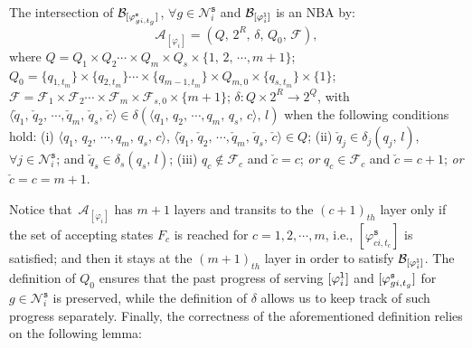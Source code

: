 \begin{definition}\label{ch03:def:intersect-all}
The intersection of $\mathcal{B}_{[\varphi_{gi,t_g}^{\textup{\texttt{s}}}]}$, $\forall g\in \mathcal{N}_i^\texttt{s}$ and $\mathcal{B}_{[\varphi_i^{\textup{\texttt{l}}}]}$ is an NBA by:
\begin{equation}\label{ch03:eq:intersect-all}
{\mathcal{A}}_{[\varphi_i]}=(Q,\, 2^{R},\, \delta, \, Q_0,\, \mathcal{F}),
\end{equation}
where $Q=Q_{1} \times Q_{2} \cdots \times Q_{m}\times Q_s  \times \{1,\,2,\,\cdots, m+1\}$; $Q_{0}=\{q_{1,t_m}\} \times \{q_{2,t_m}\} \cdots \times \{q_{m-1,t_m}\}\times  Q_{m,0}\times \{q_{s,t_m}\} \times \{1\}$; $\mathcal{F}=\mathcal{F}_{1}\times \mathcal{F}_{2} \cdots \times \mathcal{F}_{m}\times \mathcal{F}_{s,0}\times \{m+1\}$;   $\delta: Q \times 2^{R} \rightarrow 2^Q$, with $\langle \check{q}_1,\, \check{q}_2,\,\cdots,\check{q}_{m},\,\check{q}_s, \,\check{c}\rangle \in \delta(\langle {q}_1,\, {q}_2,\,\cdots,{q}_{m},\,{q}_s, \,{c}\rangle, \,l)$ when the following conditions hold:
(i) $\langle {q}_1,\, {q}_2,\,\cdots,{q}_{m},\,{q}_s, \,{c}\rangle$, $\langle \check{q}_1,\, \check{q}_2,\,\cdots,\check{q}_{m},\,\check{q}_s, \,\check{c}\rangle \in Q$;
(ii) $\check{q}_j\in \delta_j(q_j,\,l)$, $\forall j\in \mathcal{N}_i^\texttt{s}$; and  $\check{q}_s\in \delta_s(q_s,\,l)$;
(iii) $q_{c}\notin \mathcal{F}_{c}$ and $\check{c} =c$; \emph{or} $q_{c}\in \mathcal{F}_{c}$ and $\check{c}=c+1$; \emph{or} $\check{c}=c=m+1$.

\end{definition}


Notice that~${\mathcal{A}}_{[\varphi_i]}$ has $m+1$ layers and transits to the $(c+1)_{th}$ layer only if the set of accepting states $F_c$ is reached for $c=1,2,\cdots,m$, i.e., $[\varphi_{ci,t_c}^\texttt{s}]$ is satisfied; and then it stays at the $(m+1)_{th}$ layer in order to satisfy $\mathcal{B}_{[\varphi_i^{\textup{\texttt{l}}}]}$.
The definition of $Q_0$ ensures that the past progress of serving $[\varphi_i^{\textup{\texttt{l}}}]$ and $[\varphi_{gi,t_g}^{\textup{\texttt{s}}}]$ for $g\in \mathcal{N}_i^\texttt{s}$ is preserved, while the definition of $\delta$ allows us to keep track of such progress separately.
Finally, the correctness of the aforementioned definition relies on the following lemma:


